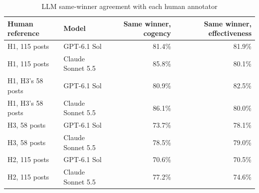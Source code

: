 \begin{table}[htbp]
\centering
\small
\caption{LLM same-winner agreement with each human annotator}
\label{tab:C2_pairwise_by_reference}
\begin{tabular}{llrr}
\toprule
Human reference & Model & Same winner, cogency & Same winner, effectiveness \\
\midrule
H1, 115 posts & GPT-6.1 Sol & 81.4\% & 81.9\% \\
H1, 115 posts & Claude Sonnet 5.5 & 85.8\% & 80.1\% \\
H1, H3's 58 posts & GPT-6.1 Sol & 80.9\% & 82.5\% \\
H1, H3's 58 posts & Claude Sonnet 5.5 & 86.1\% & 80.0\% \\
H3, 58 posts & GPT-6.1 Sol & 73.7\% & 78.1\% \\
H3, 58 posts & Claude Sonnet 5.5 & 78.5\% & 79.0\% \\
H2, 115 posts & GPT-6.1 Sol & 70.6\% & 70.5\% \\
H2, 115 posts & Claude Sonnet 5.5 & 77.2\% & 74.6\% \\
\bottomrule
\end{tabular}
\end{table}
